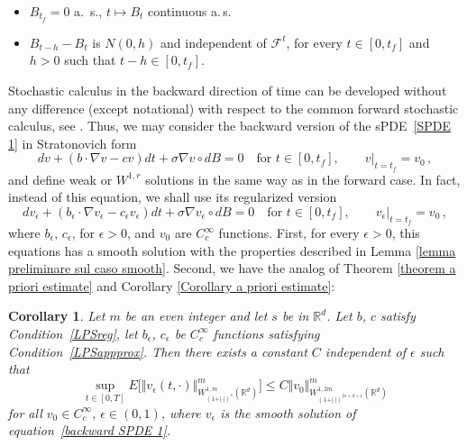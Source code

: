 \documentclass[a4paper,10pt]{article}
\newtheorem{corollary}[theorem]{Corollary}
\newcommand{\eps}{\epsilon}
\begin{document}
\begin{itemize}
  \item $B_{t_{f}}=0$ a. \,s., $t\mapsto B_{t}$ continuous a.\,s.
  \item $B_{t-h}-B_{t}$ is $N(0,h)$ and independent of $\mathcal{F}^{t}$, for every $t\in [0,t_{f}]$ and $h>0$ such that $t-h\in [0,t_{f}]$.
\end{itemize}

Stochastic calculus in the backward direction of time can be developed without
any difference (except notational) with respect to the common forward
stochastic calculus, see \cite[Chapter~3]{KUNITA84}. Thus, we may consider the
backward version of the sPDE~\eqref{SPDE 1} in Stratonovich form
\begin{equation*}
dv+ ( b\cdot\nabla v  -cv)  dt+\sigma\nabla v\circ
dB  =0 \quad \text{for } t\in [0,t_{f}], \qquad
v|_{t=t_{f}}  =v_{0} \,,
\end{equation*}
and define weak or $W^{1,r}$ solutions in the same way as in the forward case.
In fact, instead of this equation, we shall use its regularized version
\begin{equation}
\label{backward SPDE 1}
dv_{\epsilon} + ( b_{\epsilon}\cdot\nabla v_{\epsilon}
-c_{\epsilon}v_{\epsilon})  dt+\sigma\nabla v_{\epsilon}\circ dB 
=0 \quad \text{for } t\in [0,t_{f}], \qquad  
v_{\epsilon}|_{t=t_{f}}  =v_{0} \,,
\end{equation}
where $b_{\epsilon}$, $c_{\epsilon}$, for $\epsilon>0$, and $v_{0}$ are
$C_{c}^{\infty}$ functions. First, for every $\epsilon>0$, this equations has
a smooth solution with the properties described in Lemma
\ref{lemma preliminare sul caso smooth}. Second, we have the analog of Theorem
\ref{theorem a priori estimate} and Corollary
\ref{Corollary a priori estimate}:

\begin{corollary}
\label{corollary regularity backward} Let $m$ be an even integer and let $s$ be in $\mathbb{R}^d$. Let $b$, $c$ satisfy Condition~\ref{LPSreg}, let $b_{\epsilon}$, $c_{\epsilon}$ be $C_{c}^{\infty}$ functions satisfying Condition~\ref{LPSappprox}. Then there exists a constant $C$
independent of $\eps$ such that
\[
\sup_{t\in [0,T]} E\Big[ \Vert v_{\epsilon}(t,\cdot)\Vert_{W_{(1+ \vert \cdot \vert)^{s}}
^{1,m}(\mathbb{R}^{d})}^{m}\Big]  \leq C \Vert
v_{0}\Vert _{W_{(  1+ \vert \cdot \vert )
^{2s+d+1}}^{1,2m}(\mathbb{R}^{d})}^{m}
\]
for all $v_{0}\in C_{c}^{\infty}$, $\epsilon\in (0,1)$, where
$v_{\epsilon}$ is the smooth solution of equation~\eqref{backward SPDE 1}.
\end{corollary}
\end{document}
